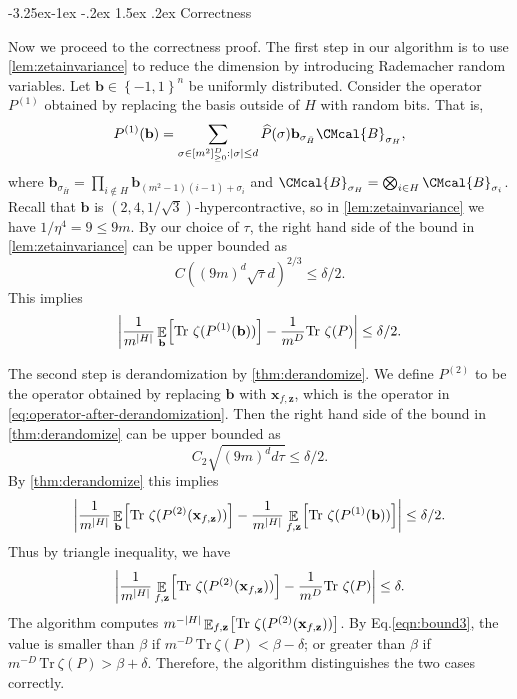 \documentclass[10pt,a4paper]{article}
\makeatletter
\renewcommand{\subsection}{\@startsection{subsection}{2}{\z@}%
             {-3.25ex\@plus -1ex \@minus -.2ex}%
             {1.5ex \@plus .2ex}%
             {\normalfont\large\scshape\bfseries}}
\def\B{\CMcal{B}}
\theoremstyle{plain}
\theoremstyle{definition}
\newcommand {\minusspace} {\: \! \!}
\newcommand {\Fn} [2] {\ensuremath{ #1 \minusspace \Br{ #2 } }}
\newcommand {\set} [1] {\ensuremath{ \left\lbrace #1 \right\rbrace }}
\newcommand {\br} [1] {\ensuremath{ \left( #1 \right) }}
\newcommand {\Br} [1] {\ensuremath{ \left[ #1 \right] }}
\newcommand {\ab} [1] {\ensuremath{ \left| #1 \right| }}
\DeclarePairedDelimiter{\abs}{\lvert}{\rvert}
\DeclareMathOperator*{\bigE}{\mathbb{E}}
\newcommand {\expec} [2] {\Fn{\bigE_{\substack{#1}}}{#2}}
\newcommand {\Tr} {\ensuremath{ \mathrm{Tr} }}
\newcommand{\randb}{\ensuremath{\mathbf{b}}}
\newcommand{\randz}{\ensuremath{\mathbf{z}}}
\newcommand{\randx}{\ensuremath{\mathbf{x}}}
\newcommand{\bits}[1]{\ensuremath{\set{-1,1}^{#1}}}
\newcommand{\dlbo} {\ensuremath{{D}}}
\newcommand{\dldd} {\ensuremath{{d}}}
\newcommand{\epreg} {\ensuremath{{\delta}}}
\newcommand{\epdr} {\ensuremath{\delta}}
\newcommand{\1}{\mathbb{1}} %
\makeatother
\begin{document}
\subsection{Correctness}

Now we proceed to the correctness proof.
The first step in our algorithm is to use \cref{lem:zetainvariance} to reduce the dimension by introducing 
Rademacher random variables.
Let $\randb\in\bits{n}$ be uniformly distributed.
Consider the operator $P^{(1)}$ obtained by replacing the basis outside of $H$ with random bits.
That is,
\[ P^{(1)}(\randb) = \sum_{\sigma\in[m^2]_{\ge 0}^{\dlbo}:\ab{\sigma}\le d}\widehat{P}(\sigma)\randb_{\sigma_{\bar{H}}}\B_{\sigma_H},\]
        where $\randb_{\sigma_{\bar{H}}} = \prod_{i\notin H}\randb_{(m^2-1)(i-1)+\sigma_i}$ and $\B_{\sigma_H}=\bigotimes_{i\in H}\B_{\sigma_i}$.
Recall that $\randb$ is $(2,4,1/\sqrt{3})$-hypercontractive,
so in \cref{lem:zetainvariance} we have $1/\eta^4 = 9 \le 9m$. By our choice of $\tau$, the right hand side of the bound in \cref{lem:zetainvariance} can be upper bounded as
\begin{equation}\label{eqn:bound1}
C\br{(9m)^d\sqrt{\tau}d}^{2/3}\le\epreg/2.
\end{equation}
This implies
$$\ab{\frac{1}{m^{\abs{H}}}\expec{\randb}{\Tr~\zeta(P^{(1)}(\randb))}-\frac{1}{m^\dlbo}\Tr~\zeta(P)}\le\delta/2.$$

The second step is derandomization by \cref{thm:derandomize}.
We define $P^{(2)}$ to be the operator obtained by replacing $\randb$ with $\randx_{f, \randz}$,
which is the operator in \cref{eq:operator-after-derandomization}.
Then the right hand side of the bound in \cref{thm:derandomize} can be upper bounded as
\begin{equation}\label{eqn:bound2}
C_2\sqrt{(9m)^\dldd\dldd\tau}\le\epdr/2.
\end{equation}
By \cref{thm:derandomize} this implies
$$\ab{\frac{1}{m^{\abs{H}}}\expec{\randb}{\Tr~\zeta(P^{(2)}(\randx_{f, \randz}))}-\frac{1}{m^{\abs{H}}}\expec{f, \randz}{\Tr~\zeta(P^{(1)}(\randb))}}\le\delta/2.$$
Thus by triangle inequality, we have
\begin{equation}\label{eqn:bound3}
\ab{\frac{1}{m^{\abs{H}}}\expec{f, \randz}{\Tr~\zeta(P^{(2)}(\randx_{f, \randz}))}-\frac{1}{m^\dlbo}\Tr~\zeta(P)}\le\delta.
\end{equation}
The algorithm computes $m^{-\abs{H}}\expec{f, \randz}{\Tr~\zeta(P^{(2)}(\randx_{f, \randz}))}$. By Eq.\eqref{eqn:bound3}, the value is smaller than $\beta$  if $m^{-\dlbo}\,\Tr~\zeta(P)<\beta-\delta$; or greater than $\beta$ if $m^{-\dlbo}\,\Tr~\zeta(P)>\beta+\delta$. Therefore, the algorithm distinguishes the two cases correctly.
\end{document}
